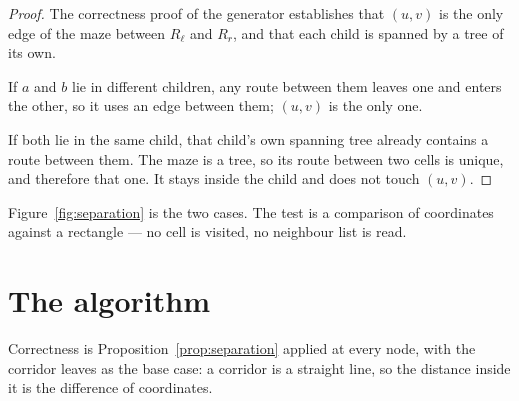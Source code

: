 \documentclass[11pt,a4paper]{article}
\begin{document}
\begin{proof}
The correctness proof of the generator establishes that $(u,v)$ is the only edge
of the maze between $R_\ell$ and $R_r$, and that each child is spanned by a tree
of its own.

If $a$ and $b$ lie in different children, any route between them leaves one and
enters the other, so it uses an edge between them; $(u,v)$ is the only one.

If both lie in the same child, that child's own spanning tree already contains a
route between them. The maze is a tree, so its route between two cells is
unique, and therefore that one. It stays inside the child and does not touch
$(u,v)$.
\end{proof}

Figure~\ref{fig:separation} is the two cases. The test is a comparison of
coordinates against a rectangle --- no cell is visited, no neighbour list is
read.



\section{The algorithm}

\begin{algorithm}[H]
\caption{The route between two cells, read off the region tree.}
\label{alg:region-route}
\BlankLine
{}
\end{algorithm}

Correctness is Proposition~\ref{prop:separation} applied at every node, with the
corridor leaves as the base case: a corridor is a straight line, so the distance
inside it is the difference of coordinates.
\end{document}
